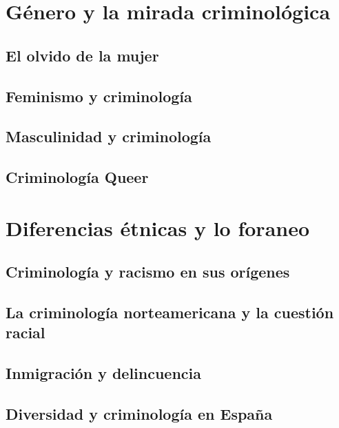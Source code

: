 \documentclass[
  spanish,
  letterpaper,
  DIV=11,
  numbers=noendperiod]{scrreprt}
\begin{document}
\chapter{Género y la mirada
criminológica}\label{guxe9nero-y-la-mirada-criminoluxf3gica}

\section{El olvido de la mujer}\label{el-olvido-de-la-mujer}

\section{Feminismo y criminología}\label{feminismo-y-criminologuxeda}

\section{Masculinidad y
criminología}\label{masculinidad-y-criminologuxeda}

\section{Criminología Queer}\label{criminologuxeda-queer}

\chapter{Diferencias étnicas y lo
foraneo}\label{diferencias-uxe9tnicas-y-lo-foraneo}

\section{Criminología y racismo en sus
orígenes}\label{criminologuxeda-y-racismo-en-sus-oruxedgenes}

\section{La criminología norteamericana y la cuestión
racial}\label{la-criminologuxeda-norteamericana-y-la-cuestiuxf3n-racial}

\section{Inmigración y
delincuencia}\label{inmigraciuxf3n-y-delincuencia}

\section{Diversidad y criminología en
España}\label{diversidad-y-criminologuxeda-en-espauxf1a}
\end{document}
